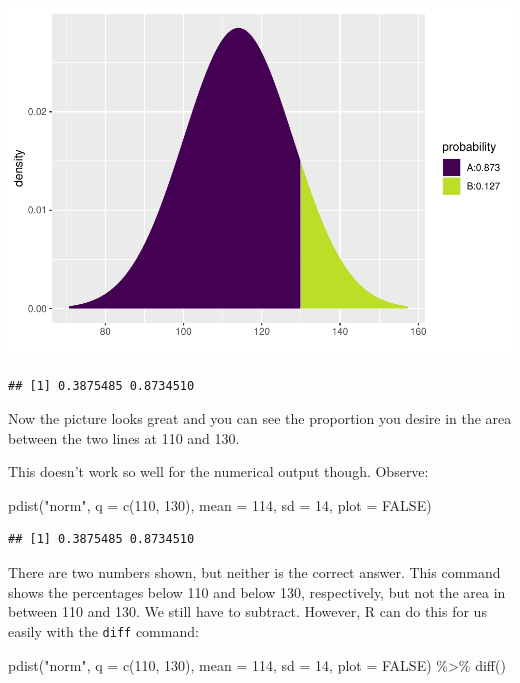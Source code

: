 \documentclass[
]{book}
\newenvironment{Shaded}{\begin{snugshade}}{\end{snugshade}}
\newcommand{\AttributeTok}[1]{\textcolor[rgb]{0.77,0.63,0.00}{#1}}
\newcommand{\ConstantTok}[1]{\textcolor[rgb]{0.00,0.00,0.00}{#1}}
\newcommand{\DecValTok}[1]{\textcolor[rgb]{0.00,0.00,0.81}{#1}}
\newcommand{\FunctionTok}[1]{\textcolor[rgb]{0.00,0.00,0.00}{#1}}
\newcommand{\NormalTok}[1]{#1}
\newcommand{\SpecialCharTok}[1]{\textcolor[rgb]{0.00,0.00,0.00}{#1}}
\newcommand{\StringTok}[1]{\textcolor[rgb]{0.31,0.60,0.02}{#1}}
\begin{document}
\includegraphics{intro_stats_files/figure-latex/unnamed-chunk-342-1.pdf}

\begin{verbatim}
## [1] 0.3875485 0.8734510
\end{verbatim}

Now the picture looks great and you can see the proportion you desire in the area between the two lines at 110 and 130.

This doesn't work so well for the numerical output though. Observe:

\begin{Shaded}
\begin{Highlighting}[]
\FunctionTok{pdist}\NormalTok{(}\StringTok{"norm"}\NormalTok{, }\AttributeTok{q =} \FunctionTok{c}\NormalTok{(}\DecValTok{110}\NormalTok{, }\DecValTok{130}\NormalTok{), }\AttributeTok{mean =} \DecValTok{114}\NormalTok{, }\AttributeTok{sd =} \DecValTok{14}\NormalTok{, }\AttributeTok{plot =} \ConstantTok{FALSE}\NormalTok{)}
\end{Highlighting}
\end{Shaded}

\begin{verbatim}
## [1] 0.3875485 0.8734510
\end{verbatim}

There are two numbers shown, but neither is the correct answer. This command shows the percentages below 110 and below 130, respectively, but not the area in between 110 and 130. We still have to subtract. However, R can do this for us easily with the \texttt{diff} command:

\begin{Shaded}
\begin{Highlighting}[]
\FunctionTok{pdist}\NormalTok{(}\StringTok{"norm"}\NormalTok{, }\AttributeTok{q =} \FunctionTok{c}\NormalTok{(}\DecValTok{110}\NormalTok{, }\DecValTok{130}\NormalTok{), }\AttributeTok{mean =} \DecValTok{114}\NormalTok{, }\AttributeTok{sd =} \DecValTok{14}\NormalTok{, }\AttributeTok{plot =} \ConstantTok{FALSE}\NormalTok{) }\SpecialCharTok{\%\textgreater{}\%}
    \FunctionTok{diff}\NormalTok{()}
\end{Highlighting}
\end{Shaded}
\end{document}
